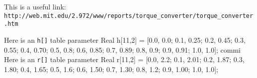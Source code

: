 \documentclass[11pt, oneside]{article}   	%
\begin{document}
This is a useful link:
\verb+http://web.mit.edu/2.972/www/reports/torque_converter/torque_converter.htm+

Here is an \verb+h[]+ table
parameter Real h[11,2] = [0.0, 0.0; 0.1, 0.25; 0.2, 0.45; 0.3, 0.55; 0.4, 0.70; 0.5, 0.8; 0.6, 0.85; 0.7, 0.89; 0.8, 0.9; 0.9, 0.91; 1.0, 1.0];
commi
Here is an \verb+r[]+ table
parameter Real r[11,2] = [0.0, 2.2; 0.1, 2.01; 0.2, 1.87; 0.3, 1.80; 0.4, 1.65; 0.5, 1.6; 0.6, 1.50; 0.7, 1.30; 0.8, 1.2; 0.9, 1.00; 1.0, 1.0];
\end{document}
